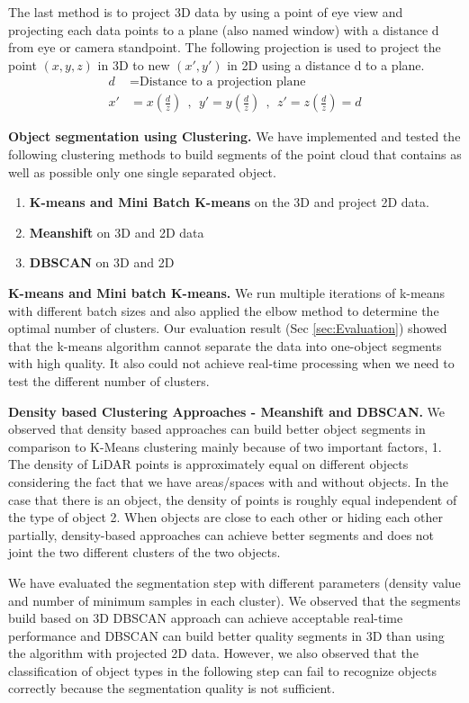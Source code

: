 The last method is to project 3D data by using a point of eye view and projecting each data points
to a plane (also named window) with a distance d from eye or camera standpoint. 
The following projection is used to project the point $(x,y,z)$ in 3D to new $(x',  y')$ in 2D
using a distance d to a plane.
\begin{align*}
d  & = \text{Distance to a projection plane} \\
x' & =  x (\frac{d}{z}) \ \  , \ \  y' =  y (\frac{d}{z}) \ \  , \ \  z'=  z (\frac{d}{z}) = d
\end{align*}

\textbf{Object segmentation using Clustering.}
We have implemented and tested the following clustering methods to build segments of the point cloud 
that contains as well as possible only one single separated object.

\begin{enumerate}
  \item \textbf{K-means and Mini Batch K-means} on the 3D and project 2D data.
  \item \textbf{Meanshift} on 3D and 2D data
  \item \textbf{DBSCAN} on 3D and 2D
\end{enumerate}

\textbf{K-means and Mini batch K-means.} 
We run multiple iterations of k-means with
different batch sizes and also applied the elbow method to determine the optimal number of clusters.
Our evaluation result (Sec \ref{sec:Evaluation}) showed that the k-means algorithm cannot separate the data into one-object segments with high quality. 
It also could not achieve real-time processing when we need to test the different number of clusters.

\textbf{Density based Clustering Approaches - Meanshift and DBSCAN.} 
We observed that density based approaches can build better object segments in comparison to K-Means clustering mainly because of two important factors, 1. The density of LiDAR points is approximately equal on different objects considering the fact that we have areas/spaces with and without objects. In the case that there is an object, the density of points is roughly equal independent of the type of object 2. When objects are close to each other or hiding each other partially, density-based approaches can achieve better segments and does not joint the two different clusters of the two objects.

We have evaluated the segmentation step with different parameters (density value and number of minimum samples in each cluster). 
We observed that the segments build based on 3D DBSCAN approach can achieve acceptable real-time performance and  DBSCAN can build better quality segments in 3D than using the algorithm with projected 2D data. However, we also observed that the classification of object types 
in the following step can fail to recognize objects correctly because the segmentation quality is not sufficient.


